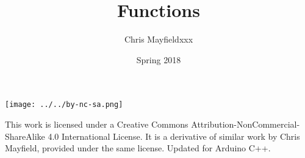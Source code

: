 \documentclass[12pt]{article}
\title{Functions}
\author{Chris Mayfieldxxx}
\date{Spring 2018}
\begin{document}
\maketitle


\newpage


\vfill

\begin{minipage}{0.133\linewidth}
\texttt{[image: ../../by-nc-sa.png]}
\end{minipage}
\hfill
\begin{minipage}{0.853\linewidth}
\small This work is licensed under a Creative Commons
Attribution-NonCommercial-ShareAlike 4.0 International License. It is a
derivative of similar work by Chris Mayfield, provided under the same
license. Updated for Arduino C++.
\end{minipage}
\clearpage
\end{document}
